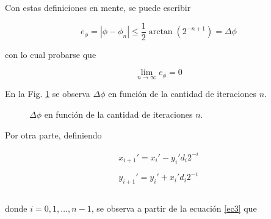 Con estas definiciones en mente, se puede escribir

\begin{equation}
\label{ec11}
e_{\phi}=|\phi - \phi_{n}| \le \displaystyle \frac{1}{2} \arctan \left( 2^{-n+1} \right) =\Delta \phi
\end{equation}

con lo cual probarse que

\begin{equation}
\lim_{n \to \infty}e_{\phi} = 0
\end{equation}

En la Fig. \ref{error} se observa $\Delta \phi$ en función de la cantidad de iteraciones $n$.

\begin{figure}[htpb]
\begin{center}
\caption{$\Delta \phi$ en función de la cantidad de iteraciones $n$.}
\label{error}
\end{center}
\end{figure}

Por otra parte, definiendo

\begin{equation}
\label{ec4}
\begin{array}{l}
x_{i+1}'=x_{i}'-y_{i}' d_{i} 2^{-i}\\
\\
y_{i+1}'=y_{i}'+x_{i}' d_{i} 2^{-i}\\
\\
\end{array}
\end{equation}

donde $i=0,1, \ldots, n-1$, se observa a partir de la ecuación \ref{ec3} que

